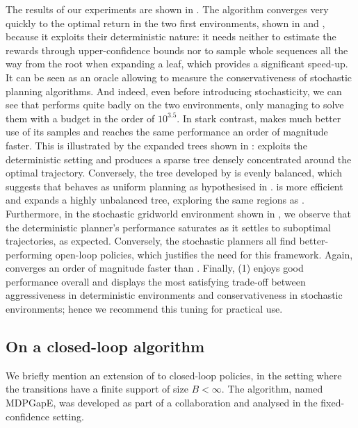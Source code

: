 The results of our experiments are shown in . The \OPD algorithm converges very quickly to the optimal return in the two first environments, shown in  and , because it exploits their deterministic nature: it needs neither to estimate the rewards through upper-confidence bounds nor to sample whole sequences all the way from the root when expanding a leaf, which provides a significant speed-up. It can be seen as an oracle allowing to measure the conservativeness of stochastic planning algorithms. And indeed, even before introducing stochasticity, we can see that \OLOP performs quite badly on the two environments, only managing to solve them with a budget in the order of $10^{3.5}$. In stark contrast, \KLOLOP makes much better use of its samples and reaches the same performance an order of magnitude faster. This is illustrated by the expanded trees shown in : \OPD exploits the deterministic setting and produces a sparse tree densely concentrated around the optimal trajectory. Conversely, the tree developed by \OLOP is evenly balanced, which suggests that \OLOP behaves as uniform planning as hypothesised in . \KLOLOP is more efficient and expands a highly unbalanced tree, exploring the same regions as \OPD. Furthermore, in the stochastic gridworld environment shown in , we observe that the deterministic \OPD planner's performance saturates as it settles to suboptimal trajectories, as expected. Conversely, the stochastic planners all find better-performing open-loop policies, which justifies the need for this framework. Again, \KLOLOP converges an order of magnitude faster than \OLOP. Finally, \KLOLOP(1) enjoys good performance overall and displays the most satisfying trade-off between aggressiveness in deterministic environments and conservativeness in stochastic environments; hence we recommend this tuning for practical use.

\subsection{On a closed-loop algorithm}

We briefly mention an extension of \KLOLOP to closed-loop policies, in the setting where the transitions have a finite support of size $B < \infty$. The algorithm, named \gls{MDPGapE}, was developed as part of a collaboration \citep{Jonsson2020planning} and analysed in the fixed-confidence setting.


